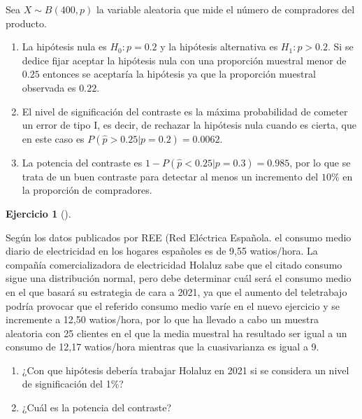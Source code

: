\documentclass[
  a4paper,
]{scrreport}
\theoremstyle{definition}
\newtheorem{exercise}{Ejercicio}[chapter]
\theoremstyle{remark}
\begin{document}
\begin{tcolorbox}[enhanced jigsaw, bottomrule=.15mm, colback=white, left=2mm, arc=.35mm, coltitle=black, toprule=.15mm, opacitybacktitle=0.6, colbacktitle=quarto-callout-tip-color!10!white, title=\textcolor{quarto-callout-tip-color}{\faLightbulb}\hspace{0.5em}{Solución}, breakable, titlerule=0mm, leftrule=.75mm, opacityback=0, bottomtitle=1mm, toptitle=1mm, colframe=quarto-callout-tip-color-frame, rightrule=.15mm]

Sea \(X\sim B(400,p)\) la variable aleatoria que mide el número de
compradores del producto.

\begin{enumerate}
\def\labelenumi{\alph{enumi}.}
\item
  La hipótesis nula es \(H_0: p=0.2\) y la hipótesis alternativa es
  \(H_1: p> 0.2\). Si se dedice fijar aceptar la hipótesis nula con una
  proporción muestral menor de \(0.25\) entonces se aceptaría la
  hipótesis ya que la proporción muestral observada es \(0.22\).
\item
  El nivel de significación del contraste es la máxima probabilidad de
  cometer un error de tipo I, es decir, de rechazar la hipótesis nula
  cuando es cierta, que en este caso es
  \(P(\hat p>0.25|p=0.2) = 0.0062\).
\item
  La potencia del contraste es \(1-P(\hat p<0.25|p=0.3) = 0.985\), por
  lo que se trata de un buen contraste para detectar al menos un
  incremento del \(10\)\% en la proporción de compradores.
\end{enumerate}

\end{tcolorbox}

\begin{exercise}[]\protect\hypertarget{exr-contraste-media-consumo-electrico}{}\label{exr-contraste-media-consumo-electrico}

Según los datos publicados por REE (Red Eléctrica Española. el consumo
medio diario de electricidad en los hogares españoles es de 9,55
watios/hora. La compañía comercializadora de electricidad Holaluz sabe
que el citado consumo sigue una distribución normal, pero debe
determinar cuál será el consumo medio en el que basará su estrategia de
cara a 2021, ya que el aumento del teletrabajo podría provocar que el
referido consumo medio varíe en el nuevo ejercicio y se incremente a
12,50 watios/hora, por lo que ha llevado a cabo un muestra aleatoria con
25 clientes en el que la media muestral ha resultado ser igual a un
consumo de 12,17 watios/hora mientras que la cuasivarianza es igual a 9.

\begin{enumerate}
\def\labelenumi{\alph{enumi}.}
\item
  ¿Con que hipótesis debería trabajar Holaluz en 2021 si se considera un
  nivel de significación del 1\%?
\item
  ¿Cuál es la potencia del contraste?
\end{enumerate}

\end{exercise}
\end{document}
